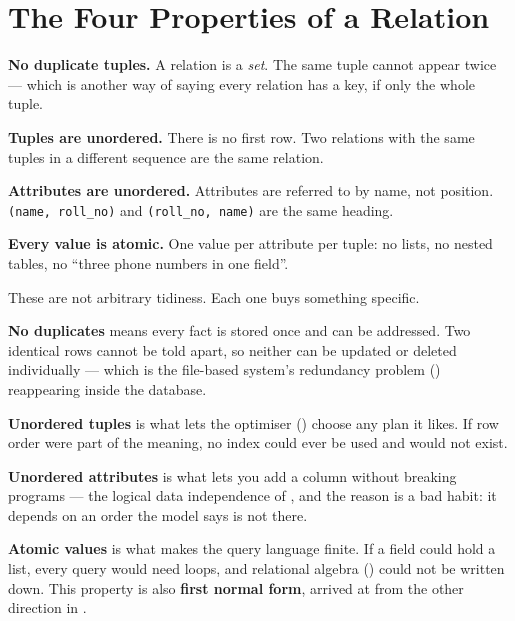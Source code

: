 \section{The Four Properties of a Relation}

\begin{definitionbox}
\begin{tightnum}
  \item \textbf{No duplicate tuples.} A relation is a \emph{set}. The same
        tuple cannot appear twice --- which is another way of saying every
        relation has a key, if only the whole tuple.
  \item \textbf{Tuples are unordered.} There is no first row. Two relations
        with the same tuples in a different sequence are the same relation.
  \item \textbf{Attributes are unordered.} Attributes are referred to by name,
        not position. \texttt{(name, roll\_no)} and \texttt{(roll\_no, name)}
        are the same heading.
  \item \textbf{Every value is atomic.} One value per attribute per tuple: no
        lists, no nested tables, no ``three phone numbers in one field''.
\end{tightnum}
\end{definitionbox}

\begin{conceptbox}
These are not arbitrary tidiness. Each one buys something specific.

\begin{tight}
  \item \textbf{No duplicates} means every fact is stored once and can be
        addressed. Two identical rows cannot be told apart, so neither can be
        updated or deleted individually --- which is the file-based system's
        redundancy problem () reappearing inside the
        database.
  \item \textbf{Unordered tuples} is what lets the optimiser
        () choose any plan it likes. If row order were part
        of the meaning, no index could ever be used and  would
        not exist.
  \item \textbf{Unordered attributes} is what lets you add a column without
        breaking programs --- the logical data independence of
        , and the reason  is a bad habit:
        it depends on an order the model says is not there.
  \item \textbf{Atomic values} is what makes the query language finite. If a
        field could hold a list, every query would need loops, and relational
        algebra () could not be written down. This property is
        also \textbf{first normal form}, arrived at from the other direction
        in .
\end{tight}
\end{conceptbox}

